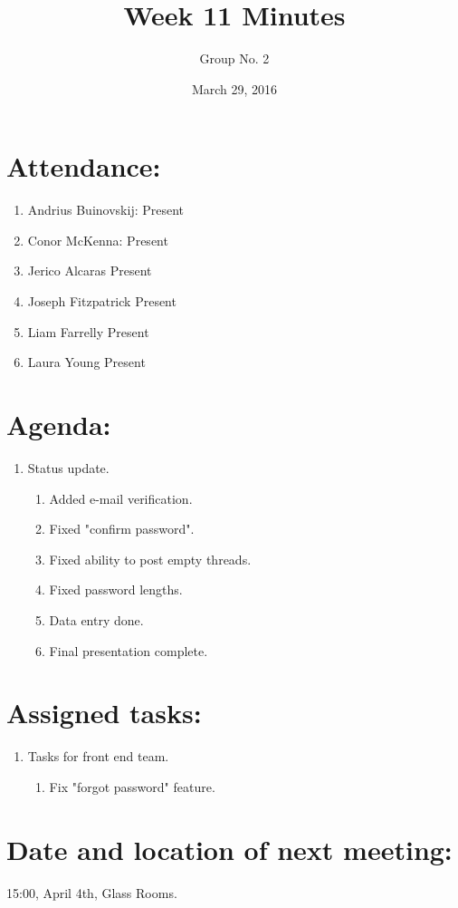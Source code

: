 \documentclass[a4paper, 12pt]{article}
\begin{document}
\title{Week 11 Minutes}
\author{Group No. 2}
\date{March 29, 2016}
\maketitle

	\section{Attendance:}
		\begin{enumerate}[label*=\arabic*.]
			\item Andrius Buinovskij:	\dotfill Present
			\item Conor McKenna:		\dotfill Present
			\item Jerico Alcaras		\dotfill Present
			\item Joseph Fitzpatrick	\dotfill Present
			\item Liam Farrelly		\dotfill Present
			\item Laura Young		\dotfill Present
		\end{enumerate}

	\section{Agenda:}
		\begin{enumerate}[label*=\arabic*.]
			\item Status update.
				\begin{enumerate}[label*=\arabic*.]
					\item Added e-mail verification.
					\item Fixed "confirm password".
					\item Fixed ability to post empty threads.
					\item Fixed password lengths.
					\item Data entry done.
					\item Final presentation complete.
				\end{enumerate}
		\end{enumerate}

	\newpage
	\section{Assigned tasks:}
		\begin{enumerate}[label*=\arabic*.]
			\item Tasks for front end team.
			\begin{enumerate}[label*=\arabic*.]
				\item Fix "forgot password" feature.
			\end{enumerate}
		\end{enumerate}

	\section{Date and location of next meeting:}
		15:00, April 4th, Glass Rooms.
\end{document}
